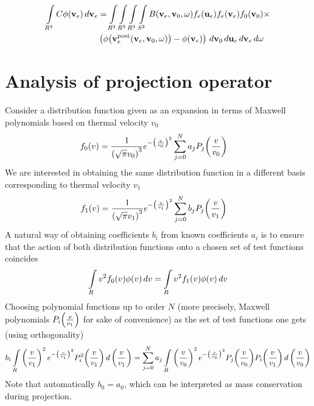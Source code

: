\documentclass{article}
\begin{document}
\begin{align}
\myint_{R^3} C \phi\of{\vect{v}_e} \diff{\vect{v}_e} 
&=
\myint_{R^3} \myint_{R^3} \myint_{R^3} \myint_{S^2} 
B\of{\vect{v}_e, \vect{v}_0, \vect{\omega}} 
f_e\of{\vect{u}_e} f_e\of{\vect{v}_e} f_0\of{\vect{v}_0} \times \\
&\left(
\phi\of{\vect{v}_e^\text{post}\of{\vect{v}_e, \vect{v}_0, \vect{\omega}}} 
- \phi\of{\vect{v}_e} 
\right)
\diff{\vect{v}_0} \diff{\vect{u}_e} \diff{\vect{v}_e} \diff{\vect{\omega}}
\end{align}



\clearpage
\section{Analysis of projection operator}
Consider a distribution function given as an expansion in terms of Maxwell polynomials based on thermal velocity $v_0$
\begin{align*}
f_0\of{v} &= \frac{1}{\left( \sqrt{\pi} v_0 \right)^3} e^{-\left( \frac{v}{v_0} \right)^2} \sum_{j=0}^{N} a_j P_j\of{\frac{v}{v_0}}
\end{align*}
We are interested in obtaining the same distribution function in a different basis corresponding to thermal velocity $v_1$
\begin{align*}
f_1 \of{v} &= \frac{1}{\left( \sqrt{\pi} v_1 \right)^3} e^{-\left( \frac{v}{v_1} \right)^2} \sum_{j=0}^{N} b_j P_j\of{\frac{v}{v_1}}
\end{align*}
A natural way of obtaining coefficients $b_i$ from known coefficients $a_i$ is to ensure that the action of both distribution functions onto a chosen set of test functions coincides
\begin{align*}
\myint_{R} {v}^2 f_0\of{v} \phi\of{v} \diff{v} = 
\myint_{R} {v}^2 f_1\of{v} \phi\of{v} \diff{v}
\end{align*}
Choosing polynomial functions up to order $N$ (more precisely, Maxwell polynomials $P_i\of{\frac{v}{v_1}}$ for sake of convenience) as the set of test functions one gets (using orthogonality)
\begin{align*}
b_i \myint_{R} \left( \frac{v}{v_1} \right)^2 e^{-\left( \frac{v}{v_1} \right)^2} P^2_i\of{\frac{v}{v_1}} \diff{\left(\frac{v}{v_1}\right)} = 
\sum_{j=0}^{N} a_j
\myint_{R} \left( \frac{v}{v_0} \right)^2 e^{-\left( \frac{v}{v_0} \right)^2}  P_j\of{\frac{v}{v_0}} P_i\of{\frac{v}{v_1}} \diff{\left(\frac{v}{v_0}\right)} 
\end{align*}
Note that automatically $b_0 = a_0$, which can be interpreted as mass conservation during projection. 
\end{document}
